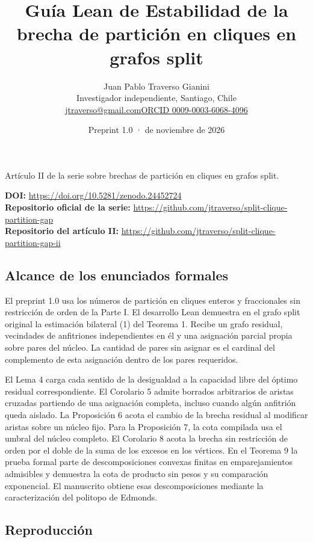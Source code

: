 \documentclass[spanish,10pt,a4paper]{article}
\title{Guía Lean de Estabilidad de la brecha de partición en cliques en grafos split}
\author{Juan Pablo Traverso Gianini\\\small Investigador independiente, Santiago, Chile\\\small\href{mailto:jtraverso@gmail.com}{jtraverso@gmail.com}\quad\href{https://orcid.org/0009-0003-6068-4096}{ORCID 0009-0003-6068-4096}}
\date{Preprint 1.0 \enspace · \enspace 23 de noviembre de 2026}
\begin{document}
\raggedbottom\maketitle\vspace{-1.5em}
\begin{center}\small Artículo II de la serie sobre brechas de partición en cliques en grafos split.\end{center}
\noindent\textbf{DOI:} \url{https://doi.org/10.5281/zenodo.24452724}\\
\textbf{Repositorio oficial de la serie:} \url{https://github.com/jtraverso/split-clique-partition-gap}\\
\textbf{Repositorio del artículo II:} \url{https://github.com/jtraverso/split-clique-partition-gap-ii}
\subsection{Alcance de los enunciados formales}\label{alcance-de-los-enunciados-formales}

El preprint 1.0 usa los números de partición en cliques enteros y fraccionales sin restricción de orden de la Parte I. El desarrollo Lean demuestra en el grafo split original la estimación bilateral (1) del Teorema 1. Recibe un grafo residual, vecindades de anfitriones independientes en él y una asignación parcial propia sobre pares del núcleo. La cantidad de pares sin asignar es el cardinal del complemento de esta asignación dentro de los pares requeridos.

El Lema 4 carga cada sentido de la desigualdad a la capacidad libre del óptimo residual correspondiente. El Corolario 5 admite borrados arbitrarios de aristas cruzadas partiendo de una asignación completa, incluso cuando algún anfitrión queda aislado. La Proposición 6 acota el cambio de la brecha residual al modificar aristas sobre un núcleo fijo. Para la Proposición 7, la cota compilada usa el umbral del núcleo completo. El Corolario 8 acota la brecha sin restricción de orden por el doble de la suma de los excesos en los vértices. En el Teorema 9 la prueba formal parte de descomposiciones convexas finitas en emparejamientos admisibles y demuestra la cota de producto sin pesos y su comparación exponencial. El manuscrito obtiene esas descomposiciones mediante la caracterización del politopo de Edmonds.

\subsection{Reproducción}\label{reproducciuxf3n}
\end{document}
